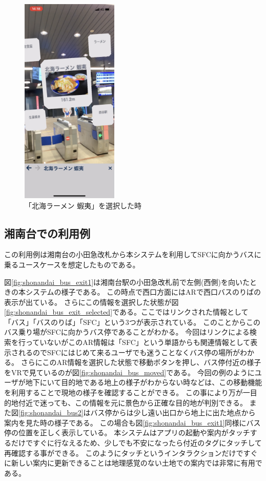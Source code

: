 \begin{figure}[h]
  \centering
  \includegraphics[height=100mm]{images/nishiya_ezo_ar.png}
  \caption{「北海ラーメン 蝦夷」を選択した時} \label{fig:nishiya_ezo_ar}
\end{figure}


\subsection{湘南台での利用例}
この利用例は湘南台の小田急改札から本システムを利用してSFCに向かうバスに乗るユースケースを想定したものである。

図\ref{fig:shonandai_bus_exit1}は湘南台駅の小田急改札前で左側(西側)を向いたときの本システムの様子である。
この時点で西口方面にはARで西口バスのりばの表示が出ている。
さらにこの情報を選択した状態が図\ref{fig:shonandai_bus_exit_selected}である。ここではリンクされた情報として「バス」「バスのりば」「SFC」という3つが表示されている。
このことからこのバス乗り場がSFCに向かうバス停であることがわかる。
今回はリンクによる検索を行っていないがこのAR情報は「SFC」という単語からも関連情報として表示されるのでSFCにはじめて来るユーザでも迷うことなくバス停の場所がわかる。
さらにこのAR情報を選択した状態で移動ボタンを押し、バス停付近の様子をVRで見ているのが図\ref{fig:shonandai_bus_moved}である。
今回の例のようにユーザが地下にいて目的地である地上の様子がわからない時などは、この移動機能を利用することで現地の様子を確認することができる。
この事により万が一目的地付近で迷っても、この情報を元に景色から正確な目的地が判別できる。
また図\ref{fig:shonandai_bus2}はバス停からは少し遠い出口から地上に出た地点から案内を見た時の様子である。
この場合も図\ref{fig:shonandai_bus_exit1}同様にバス停の位置を正しく表示している。
本システムはアプリの起動や案内がタッチするだけですぐに行なえるため、少しでも不安になったら付近のタグにタッチして再確認する事ができる。
このようにタッチというインタラクションだけですぐに新しい案内に更新できることは地理感覚のない土地での案内では非常に有用である。


